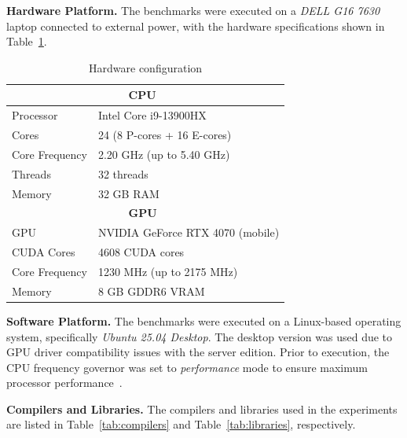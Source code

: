 \documentclass[sigconf]{acmart}
\newcommand{\mypar}[1]{{\bf #1.}}
\begin{document}
\mypar{Hardware Platform}
The benchmarks were executed on a \textit{DELL G16 7630} laptop connected to external power,
with the hardware specifications shown in Table~\ref{tab:hardware-config}.

\begin{table}[h]
      \centering
      \caption{Hardware configuration}\label{tab:hardware-config}
      \begin{tabular}{|l|l|}
            \hline
            \multicolumn{2}{|c|}{\textbf{CPU}~\cite{cpu_specs}} \\
            \hline
            Processor      & Intel Core i9-13900HX              \\
            Cores          & 24 (8 P-cores + 16 E-cores)        \\
            Core Frequency & 2.20 GHz (up to 5.40 GHz)          \\
            Threads        & 32 threads                         \\
            Memory         & 32 GB RAM                          \\
            \hline
            \hline
            \multicolumn{2}{|c|}{\textbf{GPU}~\cite{gpu_specs}} \\
            \hline
            GPU            & NVIDIA GeForce RTX 4070 (mobile)   \\
            CUDA Cores     & 4608 CUDA cores                    \\
            Core Frequency & 1230 MHz (up to 2175 MHz)          \\
            Memory         & 8 GB GDDR6 VRAM                    \\
            \hline
      \end{tabular}
\end{table}

\mypar{Software Platform}
The benchmarks were executed on a Linux-based operating system, specifically \textit{Ubuntu 25.04 Desktop}.
The desktop version was used due to GPU driver compatibility issues with the server edition. Prior to execution,
the CPU frequency governor was set to \textit{performance} mode to ensure maximum processor performance~\cite{google_benchmark:governor}.

\mypar{Compilers and Libraries}
The compilers and libraries used in the experiments are listed in Table~\ref{tab:compilers} and Table~\ref{tab:libraries}, respectively.
\end{document}
